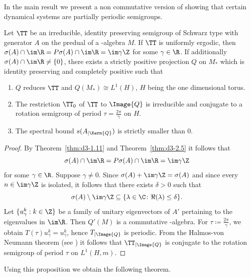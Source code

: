 In the main result we present a non commutative version of \textcite{nagel:1984} showing that certain dynamical systems are partially periodic semigroups.
\begin{proposition}\label{prop:d4-3.10}
Let $ \TT $  be an irreducible, identity preserving semigroup of Schwarz type with generator $ A $  on the predual of a \WA-algebra $ M $.
If\/ $ \TT $  is uniformly ergodic, then $ \sigma(A) \cap \im\R = P\sigma(A) \cap \im\R = \im\gamma\Z $  for some $ \gamma \in \R $.
If additionally $ \sigma(A) \cap \im\R \neq \{0\} $, there exists a strictly positive projection $ Q $  on $ M_{*} $  which is identity preserving and completely positive such that
\begin{enumerate}[\upshape (i)]
\item
$ Q $  reduces $ \TT $  and $ Q(M_{*}) \cong L^{1}(H) $, $ H $  being the one dimensional torus.

\item
The restriction $ \TT_{0} $  of\/ $ \TT $  to $ \Image{Q} $  is irreducible and conjugate to a rotation semigroup of period $ \tau = \frac{2\pi}{\gamma} $  on $ H $.

\item
The spectral bound $ s(A_{| \Kern{Q} }) $  is strictly smaller than $ 0 $.
\end{enumerate}
\end{proposition}
\begin{proof}
By Theorem~\ref{thm:d3-1.11} and Theorem~\ref{thm:d3-2.5} it follows that
\[
\sigma(A) \cap \im\R = P\sigma(A) \cap \im\R = \im\gamma\Z
\]
for some $ \gamma \in \R $.
Suppose $ \gamma \neq 0 $.
Since $ \sigma(A) + \im\gamma\Z = \sigma(A) $  and since every $ n \in \im\gamma\Z $  is isolated, it follows that there exists $ \delta > 0 $  such that
\[
\sigma(A) \setminus \im\gamma\Z \subseteq \{\lambda \in \C \colon  \Re(\lambda) \leq \delta\}.
\]
Let $ \{u_{\gamma}^{k}: k \in \Z\} $  be a family of unitary eigenvectors of\/ $ A' $  pertaining to the eigenvalues in $ \im\R $.
Then $ Q'(M) $  is a commutative \WA-algebra.
For $ \tau \coloneqq \frac{2\pi}{\gamma} $, we obtain $ T(\tau)u_{\gamma}^{k} = u_{\gamma}^{k} $, hence $ T_{\vert \Image{Q}} $  is periodic.
From the Halmos-von Neumann theorem (see \textcite[Theorem III.7.11]{schaefer:1974})
it follows that $ \TT_{\vert \Image{Q}} $  is conjugate to the rotation semigroup of period $ \tau $  on $ L^{1}(H,m) $.
\end{proof}
Using this proposition we obtain the following theorem.
